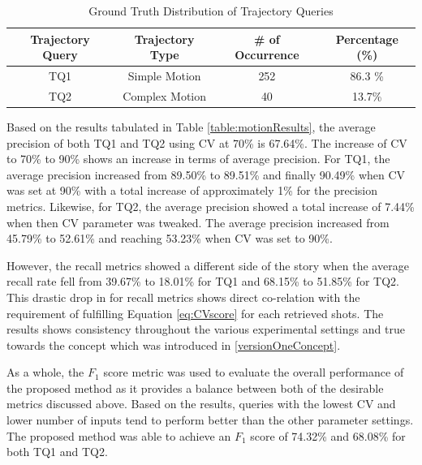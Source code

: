 \begin{table}[bht!]
\centering
\caption{Ground Truth Distribution of Trajectory Queries}
\label{table:motiondist}
\begin{tabular}{cccc}
\toprule
Trajectory Query &  Trajectory Type & \# of Occurrence & Percentage (\%)   \\
\midrule
TQ1       & Simple Motion       & 252 & 86.3 \%  \\
TQ2      & Complex Motion       & 40 & 13.7\%  \\
\bottomrule
\end{tabular}
\end{table}

Based on the results tabulated in Table \ref{table:motionResults}, the average precision of both TQ1 and TQ2 using CV at 70\% is 67.64\%. The increase of CV to 70\% to 90\% shows an increase in terms of average precision. For TQ1, the average precision increased from 89.50\% to 89.51\% and finally 90.49\% when CV was set at 90\% with a total increase of approximately 1\% for the precision metrics. Likewise, for TQ2, the average precision showed a total increase of 7.44\% when then CV parameter was tweaked. The average precision increased from 45.79\% to 52.61\% and reaching 53.23\% when CV was set to 90\%. 

However, the recall metrics showed a different side of the story when the average recall rate fell from 39.67\% to 18.01\% for TQ1 and 68.15\% to 51.85\% for TQ2. This drastic drop in for recall metrics shows direct co-relation with the requirement of fulfilling Equation \ref{eq:CVscore} for each retrieved shots. The results shows consistency throughout the various experimental settings and true towards the concept which was introduced in \ref{versionOneConcept}.  

As a whole, the $F_1$ score metric was used to evaluate the overall performance of the proposed method as it provides a balance between both of the desirable metrics discussed above. Based on the results, queries with the lowest CV and lower number of inputs tend to perform better than the other parameter settings. The proposed method was able to achieve an $F_1$ score of 74.32\% and 68.08\% for both TQ1 and TQ2. 


